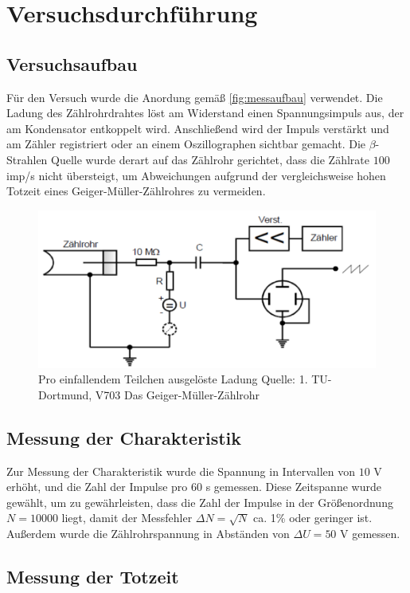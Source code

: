 \section{Versuchsdurchführung}
\subsection{Versuchsaufbau}
Für den Versuch wurde die Anordung gemäß \autoref{fig:messaufbau} verwendet. Die Ladung des Zählrohrdrahtes löst am 
Widerstand einen Spannungsimpuls aus, der am Kondensator entkoppelt wird. Anschließend wird der Impuls 
verstärkt und am Zähler registriert oder an einem Oszillographen sichtbar gemacht. Die $\beta$-Strahlen 
Quelle wurde derart auf das Zählrohr gerichtet, dass die Zählrate $100$ imp/s nicht übersteigt, um 
Abweichungen aufgrund der vergleichsweise hohen Totzeit eines Geiger-Müller-Zählrohres zu vermeiden.
\begin{figure}
    \centering
    \includegraphics{Messaufbau.pdf}
    \caption{Pro einfallendem Teilchen ausgelöste Ladung Quelle: 1. TU-Dortmund, V703 Das Geiger-Müller-Zählrohr}
    \label{fig:messaufbau}
  \end{figure}
\subsection{Messung der Charakteristik}
Zur Messung der Charakteristik wurde die Spannung in Intervallen von $10$ V erhöht, und die Zahl der Impulse 
pro 60 s gemessen. Diese Zeitspanne wurde gewählt, um zu gewährleisten, dass die Zahl der Impulse in der 
Größenordnung $N=10000$  liegt, damit der Messfehler $\Delta N=\sqrt{N}$ ca. 1\% oder geringer ist. 
Außerdem wurde die Zählrohrspannung in Abständen von $\Delta U=50$ V gemessen.
\subsection{Messung der Totzeit}
